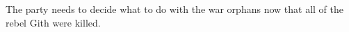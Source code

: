 The party needs to decide what to do with the war orphans now that all of the rebel Gith were killed.
